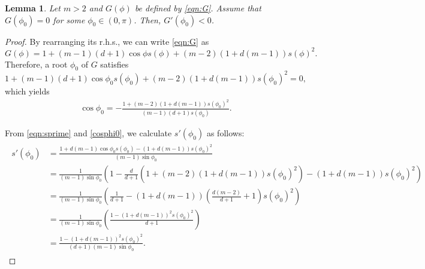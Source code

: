 \documentclass[11pt]{amsart}
\newtheorem{lemma}{Lemma}[section]
\newcommand{\dm}{d} %
\begin{document}
\begin{lemma}\label{lem:negativeprime}
Let $m>2$ and $G(\phi)$ be defined by \eqref{eqn:G}. Assume that $G(\phi_0)=0$ for some $\phi_0\in(0, \pi)$. Then, $G'(\phi_0)<0$.
\end{lemma}
\begin{proof}
By rearranging its r.h.s., we can write \eqref{eqn:G} as
\begin{equation}
\label{eqn:G-mod}
G(\phi) = 1+(m-1)(\dm+1)\cos\phi s(\phi) 
+(m-2)(1+\dm(m-1))s(\phi)^2.
\end{equation}
Therefore, a root $\phi_0$ of $G$ satisfies
\[
1+(m-1)(\dm+1)\cos\phi_0 s(\phi_0) 
+(m-2)(1+\dm(m-1))s(\phi_0)^2 = 0,
\]
which yields
\begin{align}\label{cosphi0}
\cos\phi_0=-\frac{1+(m-2)(1+\dm(m-1))s(\phi_0)^2}{(m-1)(\dm+1)s(\phi_0)}.
\end{align}

From \eqref{eqn:sprime} and \eqref{cosphi0}, we calculate $s'(\phi_0)$ as follows:
\begin{align}
\begin{aligned}\label{sprime0}
s'(\phi_0)&=\frac{1+\dm(m-1)\cos\phi_0 s(\phi_0)-(1+\dm(m-1))s(\phi_0)^2}{(m-1)\sin\phi_0}\\
&=\frac{1}{(m-1)\sin\phi_0}\left(1-\frac{\dm}{\dm+1}\left(1+(m-2)(1+\dm(m-1))s(\phi_0)^2\right)-(1+\dm(m-1))s(\phi_0)^2\right)\\
&=\frac{1}{(m-1)\sin\phi_0}\left(\frac{1}{\dm+1}-(1+\dm(m-1))\left(\frac{\dm(m-2)}{\dm+1}+1\right) s(\phi_0)^2 \right) \\
&=\frac{1}{(m-1)\sin\phi_0}\left(\frac{1-(1+\dm(m-1))^2s(\phi_0)^2}{\dm+1}\right)\\
&=\frac{1-(1+\dm(m-1))^2s(\phi_0)^2}{(\dm+1)(m-1)\sin\phi_0}.
\end{aligned}
\end{align}


\end{proof}
\end{document}

